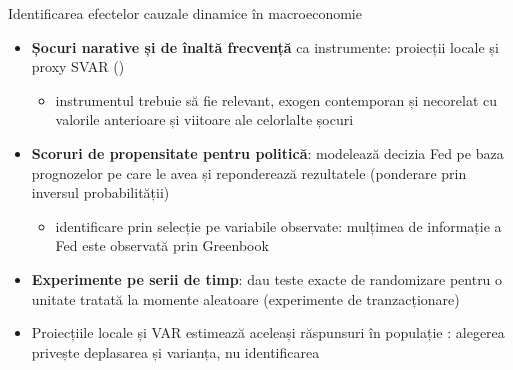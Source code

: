 \begin{frame}{Identificarea efectelor cauzale dinamice în macroeconomie}
\itemsize{\small}
\begin{itemize}
    \item \textbf{Șocuri narative și de înaltă frecvență} ca instrumente: proiecții locale  și proxy SVAR  ()
    \begin{itemize}
        \item instrumentul trebuie să fie relevant, exogen contemporan și necorelat cu valorile anterioare și viitoare ale celorlalte șocuri 
    \end{itemize}
    \item \textbf{Scoruri de propensitate pentru politică}:  modelează decizia Fed pe baza prognozelor pe care le avea și reponderează rezultatele (ponderare prin inversul probabilității)
    \begin{itemize}
        \item identificare prin selecție pe variabile observate: mulțimea de informație a Fed este observată prin Greenbook
    \end{itemize}
    \item \textbf{Experimente pe serii de timp}:  dau teste exacte de randomizare pentru o unitate tratată la momente aleatoare (experimente de tranzacționare)
    \item Proiecțiile locale și VAR estimează aceleași răspunsuri în populație : alegerea privește deplasarea și varianța, nu identificarea
\end{itemize}
\end{frame}

